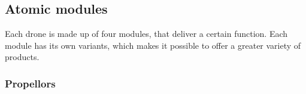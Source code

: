 \documentclass[sigconf,review]{acmart}
\begin{document}
\subsection{Atomic modules}
\label{sec:atomic-modules}

Each drone is made up of four modules, that deliver a certain function. 
Each module has its own variants, which makes it possible to offer a greater variety of products. 



\subsubsection{Propellors}
\label{sec:propellors}
\end{document}
